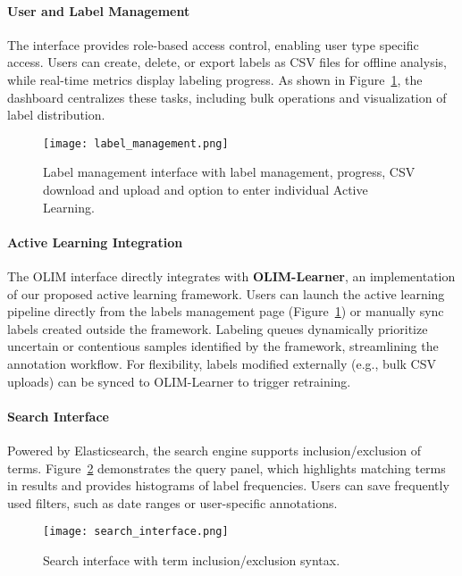 \documentclass{article}
\begin{document}
\paragraph{User and Label Management}  
The interface provides role-based access control, enabling user type specific access. Users can create, delete, or export labels as CSV files for offline analysis, while real-time metrics display labeling progress. As shown in Figure~\ref{fig:label_management}, the dashboard centralizes these tasks, including bulk operations and visualization of label distribution.

\begin{figure}[ht]
    \centering
    \texttt{[image: label\_management.png]}
    \caption{Label management interface with label management, progress, CSV download and upload and option to enter individual Active Learning.}
    \label{fig:label_management}
\end{figure}

\paragraph{Active Learning Integration}  
The OLIM interface directly integrates with \textbf{OLIM-Learner}, an implementation of our proposed active learning framework. Users can launch the active learning pipeline directly from the labels management page (Figure~\ref{fig:label_management}) or manually sync labels created outside the framework. Labeling queues dynamically prioritize uncertain or contentious samples identified by the framework, streamlining the annotation workflow. For flexibility, labels modified externally (e.g., bulk CSV uploads) can be synced to OLIM-Learner to trigger retraining.

\paragraph{Search Interface}  
Powered by Elasticsearch, the search engine supports inclusion/exclusion of terms. Figure~\ref{fig:search_interface} demonstrates the query panel, which highlights matching terms in results and provides histograms of label frequencies. Users can save frequently used filters, such as date ranges or user-specific annotations.

\begin{figure}[ht]
    \centering
    \texttt{[image: search\_interface.png]}
    \caption{Search interface with term inclusion/exclusion syntax.}
    \label{fig:search_interface}
\end{figure}
\end{document}
